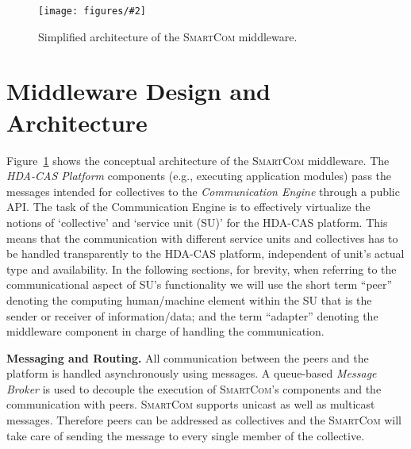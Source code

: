 \documentclass{llncs}
\newcommand{\mdl}{\textsc{SmartCom}}
\newcommand{\figfloat}[3][0.9]{
\begin{figure}[h] 
\centering
\texttt{[image: figures/\#2]}
\caption{#3}
\label{fig:#2}
\end{figure}
}
\begin{document}
  \figfloat[1.]{smartcom-architecture}{Simplified architecture of the \mdl{} middleware.}

  \section{Middleware Design and Architecture}
  \label{sec:middleware}


  Figure~\ref{fig:smartcom-architecture} shows the conceptual architecture of the \mdl{} middleware. The \emph{HDA-CAS Platform} components (e.g., executing application modules) pass the messages intended for collectives to the \emph{Communication Engine} through a public API. The task of the Communication Engine is to effectively virtualize the notions of `collective' and `service unit (SU)' for the HDA-CAS platform. This means that the communication with different service units and collectives has to be handled transparently to the HDA-CAS platform, independent of unit's actual type and availability. 
  In the following sections, for brevity, when referring to the communicational aspect of SU's functionality we will use the short term ``peer'' denoting the computing human/machine element within the SU that is the sender or receiver of information/data; and the term ``adapter'' denoting the middleware component in charge of handling the communication.

  \textbf{Messaging and Routing. }
    All communication between the peers and the platform is handled asynchronously using messages. A queue-based \emph{Message Broker} is used to decouple the execution of \mdl's components and the communication with peers. 
    \mdl{} supports unicast as well as multicast messages. Therefore peers can be addressed as collectives and the \mdl{} will take care of sending the message to every single member of the collective. 
	
\end{document}
